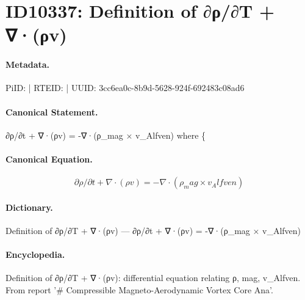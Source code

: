\section*{ID10337: Definition of ∂ρ/∂T + ∇·(ρv)}
\paragraph{Metadata.}
PiID:  | RTEID:  | UUID: 3cc6ea0c-8b9d-5628-924f-692483c08ad6

\paragraph{Canonical Statement.}
∂ρ/∂t + ∇·(ρv) = -∇·(ρ\_mag × v\_Alfven) where \{

\paragraph{Canonical Equation.}
\[
∂ρ/∂t + ∇·(ρv) = -∇·(ρ_mag × v_Alfven)
\]

\paragraph{Dictionary.}
Definition of ∂ρ/∂T + ∇·(ρv) — ∂ρ/∂t + ∇·(ρv) = -∇·(ρ\_mag × v\_Alfven)

\paragraph{Encyclopedia.}
Definition of ∂ρ/∂T + ∇·(ρv): differential equation relating ρ, mag, v\_Alfven. From report '\# Compressible Magneto-Aerodynamic Vortex Core Ana'.
